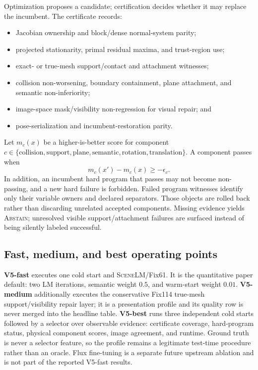 \documentclass[10pt,twocolumn]{article}
\newcommand{\method}{\textsc{SceneLM}}
\begin{document}
Optimization proposes a candidate; certification decides whether it may
replace the incumbent.  The certificate records:
\begin{itemize}
  \item Jacobian ownership and block/dense normal-system parity;
  \item projected stationarity, primal residual maxima, and trust-region use;
  \item exact- or true-mesh support/contact and attachment witnesses;
  \item collision non-worsening, boundary containment, plane attachment, and
  semantic non-inferiority;
  \item image-space mask/visibility non-regression for visual repair; and
  \item pose-serialization and incumbent-restoration parity.
\end{itemize}

Let $m_c(x)$ be a higher-is-better score for component
$c\in\{\mathrm{collision},\mathrm{support},\mathrm{plane},
\mathrm{semantic},\mathrm{rotation},\mathrm{translation}\}$.  A component
passes when
\begin{equation}
  m_c(x')-m_c(x)\ge -\epsilon_c.
  \label{eq:noninferior}
\end{equation}
In addition, an incumbent hard program that passes may not become non-passing,
and a new hard failure is forbidden.  Failed program witnesses identify only
their variable owners and declared separators.  Those objects are rolled back
rather than discarding unrelated accepted components.  Missing evidence yields
\textsc{Abstain}; unresolved visible support/attachment failures are surfaced
instead of being silently labeled successful.

\subsection{Fast, medium, and best operating points}

\textbf{V5-fast} executes one cold start and \method{}/Fix61. It is the
quantitative paper default: two LM iterations, semantic weight $0.5$, and
warm-start weight $0.01$. \textbf{V5-medium} additionally executes the
conservative Fix114 true-mesh support/visibility repair layer; it is a
presentation profile and its quality row is never merged into the headline
table. \textbf{V5-best} runs three independent cold starts followed by a
selector over observable evidence: certificate coverage, hard-program status,
physical component scores, image agreement, and runtime.  Ground truth is
never a selector feature, so the profile remains a legitimate test-time
procedure rather than an oracle.  Flux fine-tuning is a separate future
upstream ablation and is not part of the reported V5-fast results.
\end{document}

